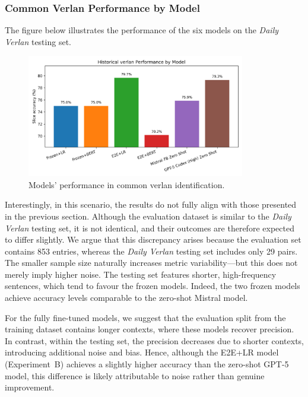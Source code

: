 \documentclass[12pt]{article}
\begin{document}
\subsubsection{Common Verlan Performance by Model}

The figure below illustrates the performance of the six models on the \textit{Daily Verlan} testing set.

\begin{figure}[htbp]
    \centering
    \includegraphics[width=0.85\textwidth]{figures/historical_verlan_comparison.png}
    \caption{Models' performance in common verlan identification.}
    \label{fig:historical-verlan-comparison}
\end{figure}

Interestingly, in this scenario, the results do not fully align with those presented in the previous section. 
Although the evaluation dataset is similar to the \textit{Daily Verlan} testing set, it is not identical, and their outcomes are therefore expected to differ slightly. 
We argue that this discrepancy arises because the evaluation set contains 853 entries, whereas the \textit{Daily Verlan} testing set includes only 29 pairs. 
The smaller sample size naturally increases metric variability\;---\;but this does not merely imply higher noise. 
The testing set features shorter, high-frequency sentences, which tend to favour the frozen models. 
Indeed, the two frozen models achieve accuracy levels comparable to the zero-shot Mistral model.

For the fully fine-tuned models, we suggest that the evaluation split from the training dataset contains longer contexts, where these models recover precision. 
In contrast, within the testing set, the precision decreases due to shorter contexts, introducing additional noise and bias. 
Hence, although the E2E+LR model (Experiment~B) achieves a slightly higher accuracy than the zero-shot GPT-5 model, this difference is likely attributable to noise rather than genuine improvement.
\end{document}
